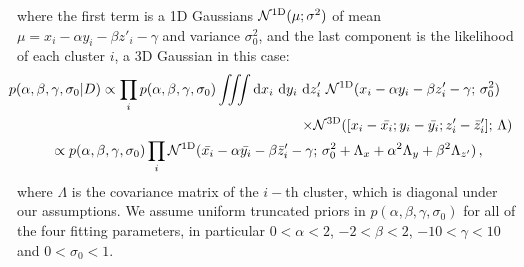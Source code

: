 {where the first term is a 1D Gaussians $\mathcal{N}^{\rm 1D}(\mu;\sigma^2)$ of mean $\mu=x_i-\alpha y_i- \beta z'_i-\gamma$ and variance $\sigma_0^2$, and the last component is the likelihood of each cluster $i$, a 3D Gaussian in this case:
\begin{multline}
\hspace{-20pt}p(\alpha,\beta,\gamma,\sigma_0|D)  \propto \prod_i p(\alpha,\beta,\gamma,\sigma_0) \iiint {\rm d} x_i ~{\rm d} y_i ~{\rm d} z'_i ~ \mathcal{N}^{\rm 1D}(x_i-\alpha y_i-\beta z'_i-\gamma ;\,\sigma_0^{2})\\
\hspace{7cm} \times \mathcal{N}^{\rm 3D}( [x_i-\bar{x_i};y_i - \bar{y_i}; z'_i - \bar{z}'_i];\,\Lambda) \\
\propto p(\alpha,\beta,\gamma,\sigma_0)  \prod_i \mathcal{N}^{\rm 1D}(\bar{x_i}-\alpha\bar{y_i}-\beta\bar{z}'_i-\gamma;\,\sigma_0^{2}+\Lambda_x+\alpha^2\Lambda_{y}+\beta^2\Lambda_{z'})\,, \label{eq:posterior}
\end{multline}
where $\Lambda$ is the covariance matrix of the $i-$th cluster, which is diagonal under our assumptions. We assume uniform truncated priors in $p(\alpha,\beta,\gamma,\sigma_0)$ for all of the four fitting parameters, in particular $0<\alpha<2$, $-2<\beta<2$, $-10<\gamma<10$ and $0<\sigma_0<1$.

}
